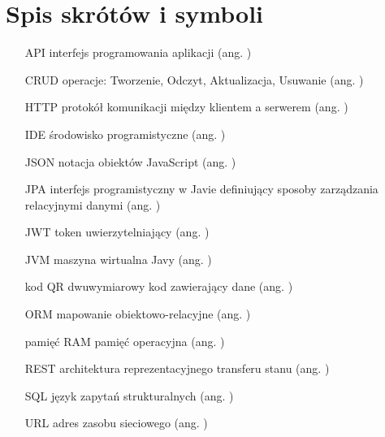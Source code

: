 \chapter{Spis skrótów i symboli}

\begin{itemize}
\item[API] interfejs programowania aplikacji (ang. )
\item[CRUD] operacje: Tworzenie, Odczyt, Aktualizacja, Usuwanie (ang. )
\item[HTTP] protokół komunikacji między klientem a serwerem (ang. )
\item[IDE] środowisko programistyczne (ang. )
\item[JSON] notacja obiektów JavaScript (ang. )
\item[JPA] interfejs programistyczny w Javie definiujący sposoby zarządzania relacyjnymi danymi (ang. )
\item[JWT] token uwierzytelniający (ang. )
\item[JVM] maszyna wirtualna Javy (ang. )
\item[kod QR] dwuwymiarowy kod zawierający dane (ang. )
\item[ORM] mapowanie obiektowo-relacyjne (ang. )
\item[pamięć RAM] pamięć operacyjna (ang. )
\item[REST] architektura reprezentacyjnego transferu stanu (ang. )
\item[SQL] język zapytań strukturalnych (ang. )
\item[URL] adres zasobu sieciowego (ang. )
\end{itemize}
